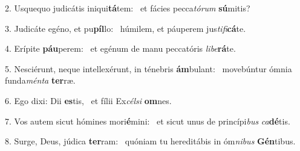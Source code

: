 2. Usquequo judicátis iniqui\textbf{tá}tem: \ast\  et fácies pecca\textit{tó}\textit{rum} \textbf{sú}mitis?\

3. Judicáte egéno, et pu\textbf{píl}lo: \ast\  húmilem, et páuperem jus\textit{ti}\textit{fi}\textbf{cá}te.\

4. Erípite \textbf{páu}perem: \ast\  et egénum de manu peccatóris \textit{li}\textit{be}\textbf{rá}te.\

5. Nesciérunt, neque intellexérunt, in ténebris \textbf{ám}bulant: \ast\  movebúntur ómnia funda\textit{mén}\textit{ta} \textbf{ter}ræ.\

6. Ego dixi: Dii \textbf{es}tis, \ast\  et fílii Ex\textit{cél}\textit{si} \textbf{om}nes.\

7. Vos autem sicut hómines mori\textbf{é}mini: \ast\  et sicut unus de princípi\textit{bus} \textit{ca}\textbf{dé}tis.\

8. Surge, Deus, júdica \textbf{ter}ram: \ast\  quóniam tu hereditábis in óm\textit{ni}\textit{bus} \textbf{Gén}tibus.\

